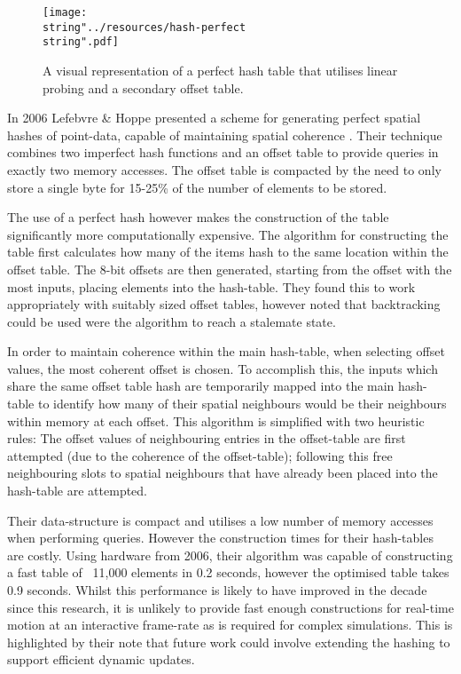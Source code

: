 \begin{wrapfigure}{O}{0.6\columnwidth}
  \begin{centering}
    \texttt{[image: \\string"../resources/hash-perfect\\string".pdf]}
  \par\end{centering}
  \protect\caption[A visual representation of a perfect hash table that utilises a secondary offset table.]{\label{fig:hash-chaining}A visual representation of a perfect hash table that utilises linear probing and a secondary offset table.}
\end{wrapfigure}
      In 2006 Lefebvre \& Hoppe presented a scheme for generating perfect spatial hashes of point-data, capable of maintaining spatial \gls{coherence} \cite{LH06}. Their technique combines two imperfect hash functions and an offset table to provide queries in exactly two memory accesses. The offset table is compacted by the need to only store a single byte for 15-25\% of the number of elements to be stored.
      
      The use of a perfect hash however makes the construction of the table significantly more computationally expensive. The algorithm for constructing the table first calculates how many of the items hash to the same location within the offset table. The 8-bit offsets are then generated, starting from the offset with the most inputs, placing elements into the hash-table. They found this to work appropriately with suitably sized offset tables, however noted that backtracking could be used were the algorithm to reach a stalemate state.
      
      In order to maintain \gls{coherence} within the main hash-table, when selecting offset values, the most coherent offset is chosen. To accomplish this, the inputs which share the same offset table hash are temporarily mapped into the main hash-table to identify how many of their spatial neighbours would be their neighbours within memory at each offset. This algorithm is simplified with two heuristic rules: The offset values of neighbouring entries in the offset-table are first attempted (due to the \gls{coherence} of the offset-table); following this free neighbouring slots to spatial neighbours that have already been placed into the hash-table are attempted.
      
      Their data-structure is compact and utilises a low number of memory accesses when performing queries. However the construction times for their hash-tables are costly. Using hardware from 2006, their algorithm was capable of constructing a fast table of ~11,000 elements in 0.2 seconds, however the optimised table takes 0.9 seconds. Whilst this performance is likely to have improved in the decade since this research, it is unlikely to provide fast enough constructions for real-time motion at an interactive frame-rate as is required for complex simulations. This is highlighted by their note that future work could involve extending the hashing to support efficient dynamic updates.
   
